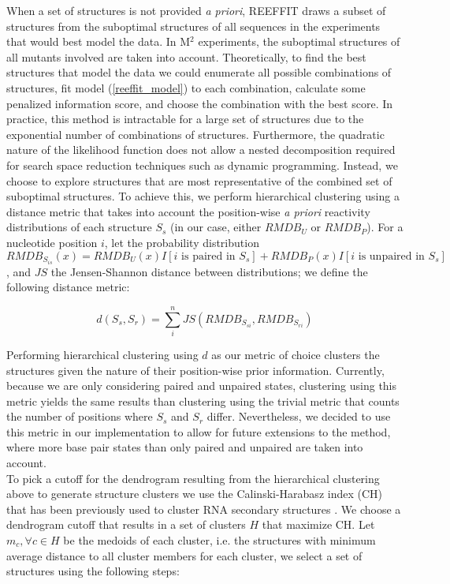 \documentclass[12pt]{article}
\begin{document}
When a set of structures is not provided \textit{a priori}, REEFFIT draws a subset of structures from the suboptimal structures of all sequences in the experiments that would best model the data. In M$^2$ experiments, the suboptimal structures of all mutants involved are taken into account. Theoretically, to find the best structures that model the data we could enumerate all possible combinations of structures, fit model (\ref{reeffit_model}) to each combination, calculate some penalized information score, and choose the combination with the best score. In practice, this method is intractable for a large set of structures due to the exponential number of combinations of structures. Furthermore, the quadratic nature of the likelihood function does not allow a nested decomposition required for search space reduction techniques such as dynamic programming. Instead, we choose to explore structures that are most representative of the combined set of suboptimal structures. To achieve this, we perform hierarchical clustering using a distance metric that takes into account the position-wise \textit{a priori} reactivity distributions of each structure $S_s$ (in our case, either $RMDB_U$ or $RMDB_P$). For a nucleotide position $i$, let the probability distribution $RMDB_{S_{is}}(x) = RMDB_U(x) I\left[i \mbox{ is paired in } S_s\right] + RMDB_P(x) I\left[i \mbox{ is unpaired in } S_s\right]$, and $JS$ the Jensen-Shannon distance between distributions; we define the following distance metric:

\[d(S_s, S_r) = \sum^n_i JS(RMDB_{S_{si}}, RMDB_{S_{ri}})\]

Performing hierarchical clustering using $d$ as our metric of choice clusters the structures given the nature of their position-wise prior information. Currently, because we are only considering paired and unpaired states, clustering using this metric yields the same results than clustering using the trivial metric that counts the number of positions where $S_s$ and $S_r$ differ. Nevertheless, we decided to use this metric in our implementation to allow for future extensions to the method, where more base pair states than only paired and unpaired are taken into account.\\
To pick a cutoff for the dendrogram resulting from the hierarchical clustering above to generate structure clusters we use the Calinski-Harabasz index (CH) that has been previously used to cluster RNA secondary structures \cite{Ding2005b}. We choose a dendrogram cutoff that results in a set of clusters $H$ that maximize CH. Let $m_c, \forall c \in H$ be the medoids of each cluster, i.e. the structures with minimum average distance to all cluster members for each cluster, we select a set of structures using the following steps:
\end{document}
